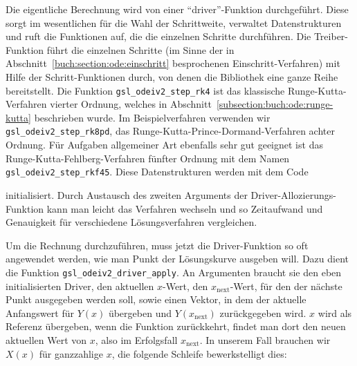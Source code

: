 Die eigentliche Berechnung wird von einer ``driver''-Funktion durchgeführt.
Diese sorgt im wesentlichen für die Wahl der Schrittweite, verwaltet
Datenstrukturen und ruft die Funktionen auf, die die einzelnen Schritte
durchführen.
Die Treiber-Funktion führt die einzelnen Schritte (im Sinne der
in Abschnitt~\ref{buch:section:ode:einschritt} besprochenen
Einschritt-Verfahren) mit
Hilfe der Schritt-Funktionen durch, von denen die Bibliothek eine
ganze Reihe bereitstellt.
Die Funktion \texttt{gsl\_odeiv2\_step\_rk4} ist das klassische
Runge-Kutta-Verfahren vierter Ordnung, welches in
Abschnitt~\ref{subsection:buch:ode:runge-kutta}
beschrieben wurde.
%
Im Beispielverfahren verwenden wir \texttt{gsl\_odeiv2\_step\_rk8pd},
das Runge-Kutta-Prince-Dormand-Verfahren achter Ordnung.
%
Für Aufgaben allgemeiner Art ebenfalls sehr gut geeignet ist das
Runge-Kutta-Fehlberg-Verfahren fünfter Ordnung mit dem Namen
\texttt{gsl\_odeiv2\_step\_rkf45}.
%
Diese Datenstrukturen werden mit dem Code

initialisiert.
Durch Austausch des zweiten Arguments der Driver-Allozierungs-Funktion
kann man leicht das Verfahren wechseln und so Zeitaufwand und Genauigkeit
für verschiedene Lösungsverfahren vergleichen.
%

Um die Rechnung durchzuführen, muss jetzt die Driver-Funktion so oft
angewendet werden, wie man Punkt der Lösungskurve ausgeben will.
Dazu dient die Funktion \texttt{gsl\_odeiv2\_driver\_apply}. 
An Argumenten braucht sie den eben initialisierten Driver, den aktuellen
$x$-Wert, den $x_{\text{next}}$-Wert, für den der nächste Punkt
ausgegeben werden soll, sowie einen Vektor, in dem der aktuelle Anfangswert
für $Y(x)$ übergeben und $Y(x_{\text{next}})$ zurückgegeben wird.
$x$ wird als Referenz übergeben, wenn die Funktion zurückkehrt,
findet man dort den neuen aktuellen Wert von $x$, also im Erfolgsfall
$x_{\text{next}}$.
In unserem Fall brauchen wir $X(x)$ für ganzzahlige $x$, die folgende
Schleife bewerkstelligt dies:


